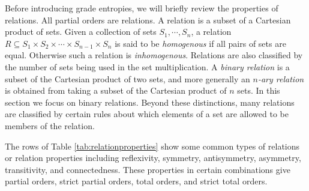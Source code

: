 \documentclass[
  letterpaper,
  DIV=11,
  numbers=noendperiod]{scrreprt}
\begin{document}
Before introducing grade entropies, we will briefly review the
properties of relations. All partial orders are relations. A relation is
a subset of a Cartesian product of sets. Given a collection of sets
\(S_1,\cdots, S_n\), a relation
\(R \subseteq S_1 \times S_2 \times \cdots \times S_{n-1} \times S_n\)
is said to be \emph{homogenous} if all pairs of sets are equal.
Otherwise such a relation is \emph{inhomogenous}. Relations are also
classified by the number of sets being used in the set multiplication. A
\emph{binary relation} is a subset of the Cartesian product of two sets,
and more generally an \emph{\(n\)-ary relation} is obtained from taking
a subset of the Cartesian product of \(n\) sets. In this section we
focus on binary relations. Beyond these distinctions, many relations are
classified by certain rules about which elements of a set are allowed to
be members of the relation.

The rows of Table \ref{tab:relationproperties} show some common types of
relations or relation properties including reflexivity, symmetry,
antisymmetry, asymmetry, transitivity, and connectedness. These
properties in certain combinations give partial orders, strict partial
orders, total orders, and strict total orders.
\end{document}
